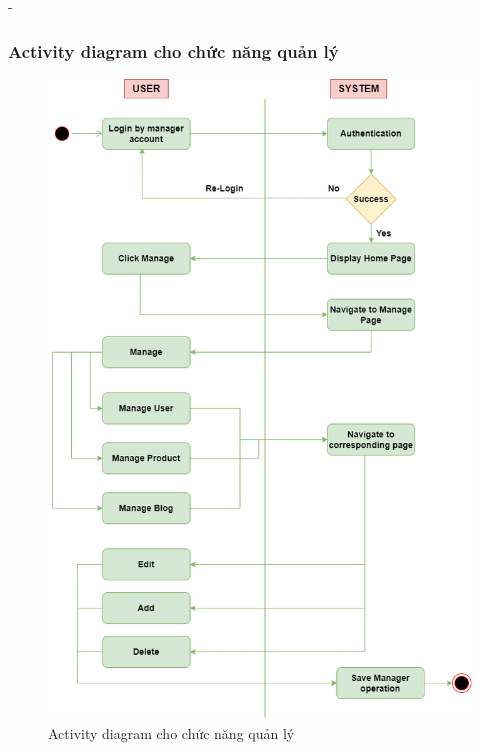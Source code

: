 \begin {list} {-}{}
\subsubsection{Activity diagram cho chức năng quản lý}
\begin{figure}[H]
    \centering
    \includegraphics[scale=0.5]{images/hieu/chap-3/manage-activity-diagram.png}
    \caption{Activity diagram cho chức năng quản lý}
\end{figure}
\newpage

\end{list}
